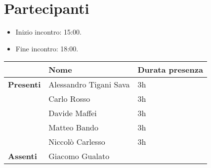 \section{Partecipanti}

\begin{itemize}
    \item Inizio incontro: 15:00.
    \item Fine incontro: 18:00.
\end{itemize}


\begin{center}
{\renewcommand{\arraystretch}{1.5}
\begin{tabular}{lll}
	                    & \textbf{Nome}  			& \textbf{Durata presenza} \\
	\hline
	\textbf{Presenti}	& Alessandro Tigani Sava 	& 3h 					\\ 
						& Carlo Rosso 				& 3h 					\\
						& Davide Maffei 			& 3h 					\\
						& Matteo Bando 				& 3h 					\\
						& Niccolò Carlesso          & 3h					\\
	\hline
	\textbf{Assenti}	& Giacomo Gualato           &      					\\
\end{tabular}	
}
\end{center}